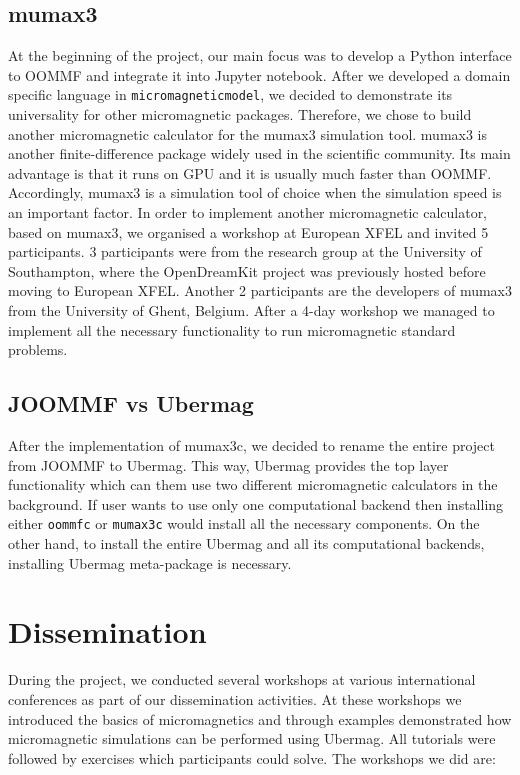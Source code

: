 \documentclass{deliverablereport}
\begin{document}
\subsection{mumax3}

At the beginning of the project, our main focus was to develop a
Python interface to OOMMF and integrate it into Jupyter
notebook. After we developed a domain specific language in
\texttt{micromagneticmodel}, we decided to demonstrate its
universality for other micromagnetic packages. Therefore, we chose to
build another micromagnetic calculator for the mumax3 simulation
tool. mumax3 is another finite-difference package widely used in the
scientific community. Its main advantage is that it runs on GPU and it
is usually much faster than OOMMF. Accordingly, mumax3 is a simulation
tool of choice when the simulation speed is an important factor. In
order to implement another micromagnetic calculator, based on mumax3,
we organised a workshop at European XFEL and invited 5 participants. 3
participants were from the research group at the University of
Southampton, where the OpenDreamKit project was previously hosted
before moving to European XFEL. Another 2 participants are the
developers of mumax3 from the University of Ghent, Belgium. After a
4-day workshop we managed to implement all the necessary functionality
to run micromagnetic standard problems.

\subsection{JOOMMF vs Ubermag}

After the implementation of mumax3c, we decided to rename the entire
project from JOOMMF to Ubermag. This way, Ubermag provides the top
layer functionality which can them use two different micromagnetic
calculators in the background. If user wants to use only one
computational backend then installing either \texttt{oommfc} or
\texttt{mumax3c} would install all the necessary components. On the
other hand, to install the entire Ubermag and all its computational
backends, installing Ubermag meta-package is necessary.

\section{Dissemination}

During the project, we conducted several workshops at various
international conferences as part of our dissemination activities. At
these workshops we introduced the basics of micromagnetics and through
examples demonstrated how micromagnetic simulations can be performed
using Ubermag. All tutorials were followed by exercises which
participants could solve. The workshops we did are:
\end{document}
